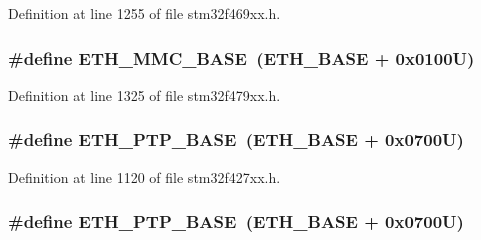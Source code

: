 Definition at line 1255 of file stm32f469xx.\+h.

\subsubsection[{\texorpdfstring{E\+T\+H\+\_\+\+M\+M\+C\+\_\+\+B\+A\+SE}{ETH_MMC_BASE}}]{\setlength{\rightskip}{0pt plus 5cm}\#define E\+T\+H\+\_\+\+M\+M\+C\+\_\+\+B\+A\+SE~({\bf E\+T\+H\+\_\+\+B\+A\+SE} + 0x0100\+U)}\hypertarget{group___peripheral__memory__map_ga4946f2b3b03f7998343ac1778fbcf725}{}\label{group___peripheral__memory__map_ga4946f2b3b03f7998343ac1778fbcf725}


Definition at line 1325 of file stm32f479xx.\+h.

\subsubsection[{\texorpdfstring{E\+T\+H\+\_\+\+P\+T\+P\+\_\+\+B\+A\+SE}{ETH_PTP_BASE}}]{\setlength{\rightskip}{0pt plus 5cm}\#define E\+T\+H\+\_\+\+P\+T\+P\+\_\+\+B\+A\+SE~({\bf E\+T\+H\+\_\+\+B\+A\+SE} + 0x0700\+U)}\hypertarget{group___peripheral__memory__map_gaa0f60b922aeb7275c785cbaa8f94ecf0}{}\label{group___peripheral__memory__map_gaa0f60b922aeb7275c785cbaa8f94ecf0}


Definition at line 1120 of file stm32f427xx.\+h.

\subsubsection[{\texorpdfstring{E\+T\+H\+\_\+\+P\+T\+P\+\_\+\+B\+A\+SE}{ETH_PTP_BASE}}]{\setlength{\rightskip}{0pt plus 5cm}\#define E\+T\+H\+\_\+\+P\+T\+P\+\_\+\+B\+A\+SE~({\bf E\+T\+H\+\_\+\+B\+A\+SE} + 0x0700\+U)}\hypertarget{group___peripheral__memory__map_gaa0f60b922aeb7275c785cbaa8f94ecf0}{}\label{group___peripheral__memory__map_gaa0f60b922aeb7275c785cbaa8f94ecf0}


